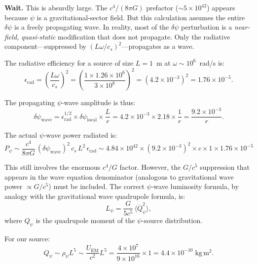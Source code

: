 \documentclass[11pt,a4paper]{article}
\begin{document}
\textbf{Wait.} This is absurdly large. The $c^4/(8\pi G)$ prefactor ($\sim 5 \times 10^{42}$)
appears because $\psi$ is a gravitational-sector field. But this calculation assumes the
entire $\delta\psi$ is a freely propagating wave. In reality, most of the $\delta\psi$
perturbation is a \emph{near-field, quasi-static} modification that does not propagate.
Only the radiative component---suppressed by $(L\omega/c_s)^2$---propagates as a wave.

The radiative efficiency for a source of size $L = 1$~m at $\omega \sim 10^6$~rad/s is:
\begin{equation}
\epsilon_{\mathrm{rad}} = \left(\frac{L\omega}{c_s}\right)^2
= \left(\frac{1 \times 1.26 \times 10^6}{3 \times 10^8}\right)^2
= (4.2 \times 10^{-3})^2 = 1.76 \times 10^{-5}.
\end{equation}

The propagating $\psi$-wave amplitude is thus:
\begin{equation}
\delta\psi_{\mathrm{wave}} = \epsilon_{\mathrm{rad}}^{1/2} \times \delta\psi_{\mathrm{local}}
\times \frac{L}{r} = 4.2 \times 10^{-3} \times 2.18 \times \frac{1}{r}
= \frac{9.2 \times 10^{-3}}{r}.
\end{equation}

The actual $\psi$-wave power radiated is:
\begin{equation}
P_\psi \sim \frac{c^4}{8\pi G}\,(\delta\psi_{\mathrm{wave}})^2\,c_s\,L^2\,\epsilon_{\mathrm{rad}}
\sim 4.84 \times 10^{42} \times (9.2 \times 10^{-3})^2 \times c \times 1 \times 1.76 \times 10^{-5}
\end{equation}

This still involves the enormous $c^4/G$ factor. However, the $G/c^5$ suppression that
appears in the wave equation denominator (analogous to gravitational wave power
$\propto G/c^5$) must be included. The correct $\psi$-wave luminosity formula, by
analogy with the gravitational wave quadrupole formula, is:
\begin{equation}\label{eq:Lpsi}
L_\psi = \frac{G}{5 c^5}\,\langle\dddot{Q}_\psi^2\rangle,
\end{equation}
where $Q_\psi$ is the quadrupole moment of the $\psi$-source distribution.

For our source:
\begin{equation}
Q_\psi \sim \rho_\psi L^5 \sim \frac{U_{\mathrm{EM}}}{c^2} L^5
= \frac{4 \times 10^7}{9 \times 10^{16}} \times 1 = 4.4 \times 10^{-10}\;\mathrm{kg\,m^2}.
\end{equation}
\end{document}
